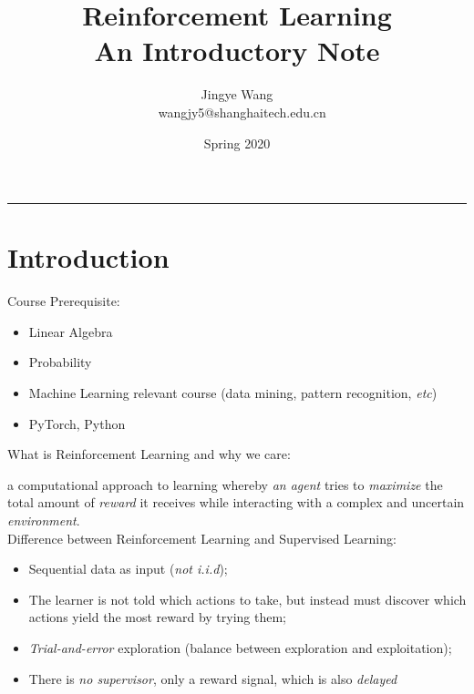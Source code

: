 \documentclass{progartcn}
\title{\bfseries\sffamily 
  Reinforcement Learning \\ %
  \normalfont\zihao{-3}
    \textbf{An Introductory Note}%
}
\author{Jingye Wang \\ \faEnvelope~ wangjy5@shanghaitech.edu.cn}  %
\date{Spring 2020}
\begin{document}
\sloppy %


\maketitle
\thispagestyle{empty}
\renewcommand{\refname}{References}
\renewcommand{\contentsname}{Contents}

\begin{comment}
\noindent\rule[0.25\baselineskip]{\textwidth}{1pt}

	The framework of this note is enlightened by \textit{SI-252}~\cite{si252}, while the contents mainly derived from not only \textit{SI-252} but also \textit{Intro to Reinforcement Learning, Bolei Zhou}~\cite{introRL}, \textit{Reinforcement Learning, David Silver}~\cite{ucl_rl}, \textit{etc}. Many thanks to these great works!
\end{comment}

\noindent\rule[0.25\baselineskip]{\textwidth}{1pt}


\setcounter{tocdepth}{2}
\setcounter{secnumdepth}{4}
\tableofcontents

\pagebreak

\section{Introduction}

	Course Prerequisite:
	\begin{itemize}[noitemsep,topsep=0pt]
		\item Linear Algebra
		\item Probability
		\item Machine Learning relevant course (data mining, pattern recognition, \textit{etc})
		\item PyTorch, Python\\
	\end{itemize}

	What is Reinforcement Learning and why we care:

	a computational approach to learning whereby \textit{an agent} tries to \textit{maximize} the total amount of \textit{reward} it receives while interacting with a complex and uncertain \textit{environment}.\cite{sutton2018reinforcement}\\

	Difference between Reinforcement Learning and Supervised Learning:
	\begin{itemize}[noitemsep,topsep=0pt]
		\item Sequential data as input (\textit{not i.i.d});
		\item The learner is not told which actions to take, but instead must discover which actions yield the most reward by trying them;
		\item \textit{Trial-and-error} exploration (balance between exploration and exploitation);
		\item There is \textit{no supervisor}, only a reward signal, which is also \textit{delayed}\\
	\end{itemize}
\end{document}
